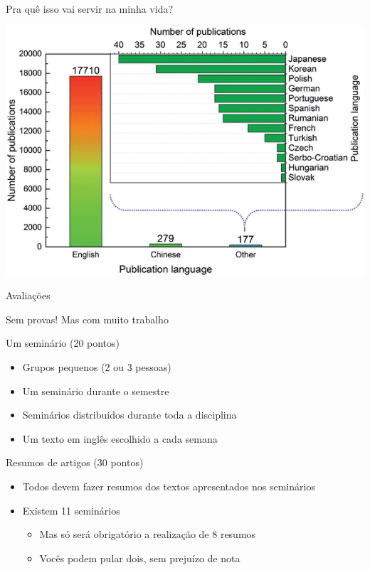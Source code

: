 \documentclass[compress,mathserif]{beamer}
\begin{document}

\begin{frame}{Pra quê isso vai servir na minha vida?}

\centering \includegraphics[width=\textwidth]{images/papers_ingles.png}
\end{frame}


\begin{frame}{Avaliações}

Sem provas! Mas com muito trabalho

\vspace{0.25cm}

Um seminário (20 pontos)
\begin{itemize}
    \item Grupos pequenos (2 ou 3 pessoas)
    \item Um seminário durante o semestre
    \item Seminários distribuídos durante toda a disciplina
    \item Um texto em inglês escolhido a cada semana
\end{itemize}

Resumos de artigos (30 pontos)
\begin{itemize}
    \item Todos devem fazer resumos dos textos apresentados nos seminários
    \item Existem 11 seminários
    \begin{itemize}
        \item Mas só será obrigatório a realização de 8 resumos
        \item Vocês podem pular dois, sem prejuízo de nota
    \end{itemize}
\end{itemize}

\end{frame}
\end{document}
